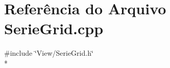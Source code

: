 \section{Referência do Arquivo Serie\+Grid.\+cpp}
\label{_serie_grid_8cpp}
{\ttfamily \#include \char`\"{}View/\+Serie\+Grid.\+h\char`\"{}}\\*
